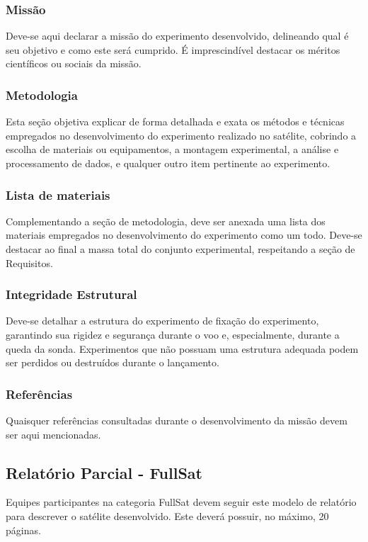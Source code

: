         \subsubsection{Missão}
            Deve-se aqui declarar a missão do experimento desenvolvido, delineando qual é seu objetivo e como este será cumprido. É imprescindível destacar os méritos científicos ou sociais da missão.
        
        \subsubsection{Metodologia}
            Esta seção objetiva explicar de forma detalhada e exata os métodos e técnicas empregados no desenvolvimento do experimento realizado no satélite, cobrindo a escolha de materiais ou equipamentos, a montagem experimental, a análise e processamento de dados, e qualquer outro item pertinente ao experimento.

        \subsubsection{Lista de materiais}
            Complementando a seção de metodologia, deve ser anexada uma lista dos materiais empregados no desenvolvimento do experimento como um todo. Deve-se destacar ao final a massa total do conjunto experimental, respeitando a seção de Requisitos.

        \subsubsection{Integridade Estrutural}
            Deve-se detalhar a estrutura do experimento de fixação do experimento, garantindo sua rigidez e segurança durante o voo e, especialmente, durante a queda da sonda. Experimentos que não possuam uma estrutura adequada podem ser perdidos ou destruídos durante o lançamento.

        \subsubsection{Referências}
            Quaisquer referências consultadas durante o desenvolvimento da missão devem ser aqui mencionadas.

    \subsection{Relatório Parcial - FullSat}
        Equipes participantes na categoria FullSat devem seguir este modelo de relatório para descrever o satélite desenvolvido. Este deverá possuir, no máximo, 20 páginas.

